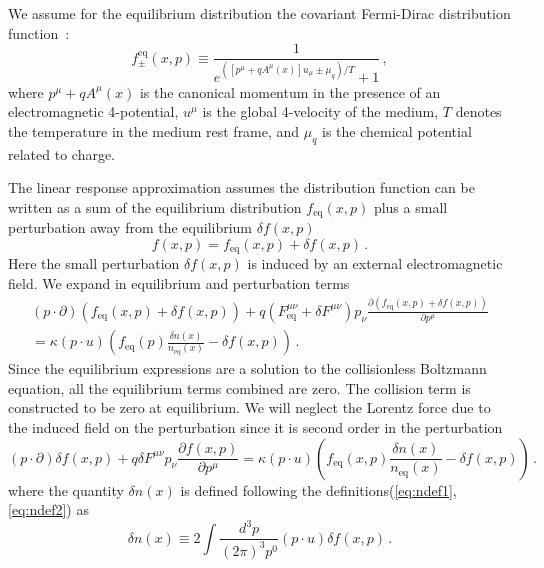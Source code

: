We assume for the equilibrium distribution the covariant Fermi-Dirac distribution function~\cite{DeGroot:1980dk,Hakim:1967prd}:
\begin{equation}\label{eq:fb}
f^\mathrm{eq}_\pm(x,p) \equiv \frac{1}{e^{([p^{\mu} +q A^\mu (x) ] u_\mu\pm \mu_q)/T} + 1}\,,
\end{equation}
where $p^\mu+q A^\mu (x)$ is the canonical momentum in the presence of an electromagnetic 4-potential, $u^\mu$ is the global 4-velocity of the medium, $T$ denotes the temperature in the medium rest frame, and $\mu_q$ is the chemical potential related to charge. 

The linear response approximation assumes the distribution function can be written as a sum of the equilibrium distribution $f_\mathrm{eq}(x,p)$ plus a small perturbation away from the equilibrium $\delta f(x,p)$
\begin{equation}\label{eq:perturbation}
f(x,p) = f_\mathrm{eq}(x,p) + \delta f(x,p)\,.
\end{equation}
Here the small perturbation $\delta f(x,p)$ is induced by an external electromagnetic field. We expand  in equilibrium and perturbation terms \cite{melrose2008quantum}
\begin{multline}
    (p \cdot \partial)\left(f_\mathrm{eq}(x,p)+ \delta f(x,p)\right) +  q \left(F_{\mathrm{eq}}^{\mu\nu} +\delta F^{\mu\nu}\right)p_\nu \frac{\partial (f_\mathrm{eq}(x,p)+\delta f(x,p))}{\partial p^\mu} \\ = \kappa (p\cdot u)\left(f_\mathrm{eq} (p)\frac{\delta n(x)}{{n_\mathrm{eq}(x)}} - \delta f(x,p)\right)\,.
\end{multline}
Since the equilibrium expressions are a solution to the collisionless Boltzmann equation, all the equilibrium terms combined are zero. The collision term is constructed to be zero at equilibrium. We will neglect the Lorentz force due to the induced field on the perturbation since it is second order in the perturbation
\begin{equation}
    (p \cdot \partial) \delta f(x,p)+ q \delta F^{\mu\nu}p_\nu \frac{\partial f(x,p)}{\partial p^\mu} = \kappa (p\cdot u)\left(f_{\text{eq}} (x,p)\frac{\delta n(x)}{{n_{\text{eq}}(x)}} - \delta f(x,p)\right)\,.
\end{equation}
where the quantity $\delta n(x)$ is defined following the definitions(\ref{eq:ndef1},\ref{eq:ndef2}) as
\begin{equation}
\delta n (x) \equiv 2 \int \frac{d^3p}{(2\pi)^3p^0} (p \cdot u)\delta f(x,p)\,.
\end{equation}
